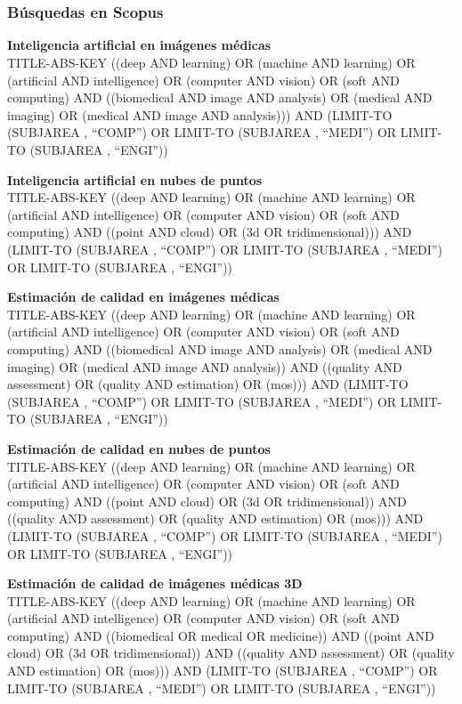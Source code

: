 \chapter*{}
\subsection*{Búsquedas en Scopus}
\label{subs:Scopus}
\begin{enumerate}
\item 
{\footnotesize
  \textbf{Inteligencia artificial en imágenes médicas}\\\hfill
 TITLE-ABS-KEY ((deep AND learning) OR (machine AND learning) 
 OR (artificial AND intelligence) OR (computer AND vision) 
 OR (soft AND computing) AND ((biomedical AND image AND analysis) 
 OR (medical AND imaging) OR (medical AND image AND analysis))) 
 AND (LIMIT-TO (SUBJAREA , ``COMP'') OR LIMIT-TO (SUBJAREA , ``MEDI'') 
OR LIMIT-TO (SUBJAREA , ``ENGI''))
}
{\footnotesize
 \item \textbf{Inteligencia artificial en nubes de puntos}\\\hfill
 TITLE-ABS-KEY ((deep AND learning) OR (machine AND learning) OR (artificial AND intelligence) OR (computer AND vision) OR (soft AND computing) AND ((point AND cloud) OR (3d OR tridimensional))) AND (LIMIT-TO (SUBJAREA , ``COMP'') OR LIMIT-TO (SUBJAREA , ``MEDI'') OR LIMIT-TO (SUBJAREA , ``ENGI''))
}
{\footnotesize
 \item \textbf{Estimación de calidad en imágenes médicas}\\\hfill
 TITLE-ABS-KEY ((deep AND learning) OR (machine AND learning) OR (artificial AND intelligence) OR (computer AND vision) OR (soft AND computing) AND ((biomedical AND image AND analysis) OR (medical AND imaging) OR (medical AND image AND analysis)) AND ((quality AND assessment) OR (quality AND estimation) OR (mos))) AND (LIMIT-TO (SUBJAREA , ``COMP'') OR LIMIT-TO (SUBJAREA , ``MEDI'') OR LIMIT-TO (SUBJAREA , ``ENGI'')) 
}
{\footnotesize
 \item \textbf{Estimación de calidad en nubes de puntos}\\\hfill
 TITLE-ABS-KEY ((deep AND learning) OR (machine AND learning) OR (artificial AND intelligence) OR (computer AND vision) OR (soft AND computing) AND ((point AND cloud) OR (3d OR tridimensional)) AND ((quality AND assessment) OR (quality AND estimation) OR (mos))) AND (LIMIT-TO (SUBJAREA , ``COMP'') OR LIMIT-TO (SUBJAREA , ``MEDI'') OR LIMIT-TO (SUBJAREA , ``ENGI''))
}
{\footnotesize
 \item \textbf{Estimación de calidad de imágenes médicas 3D}\\\hfill
 TITLE-ABS-KEY ((deep AND learning) OR (machine AND learning) OR (artificial AND intelligence) OR (computer AND vision) OR (soft AND computing) AND ((biomedical OR medical OR medicine)) AND ((point AND cloud) OR (3d OR tridimensional)) AND ((quality AND assessment) OR (quality AND estimation) OR (mos))) AND (LIMIT-TO (SUBJAREA , ``COMP'') OR LIMIT-TO (SUBJAREA , ``MEDI'') OR LIMIT-TO (SUBJAREA , ``ENGI''))
}
\end{enumerate}

